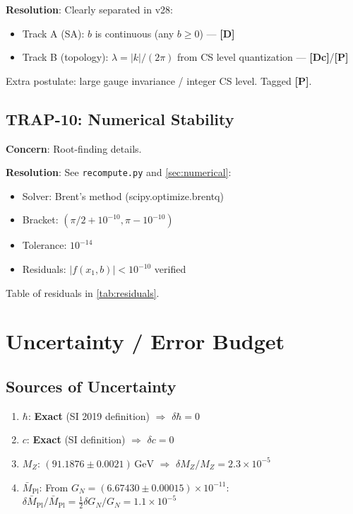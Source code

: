 \documentclass[11pt,a4paper]{article}
\newcommand{\Mpl}{\bar{M}_{\mathrm{Pl}}}
\newcommand{\MZ}{M_Z}
\newcommand{\GeV}{\,\mathrm{GeV}}
\newcommand{\tagD}{\textbf{[D]}}
\newcommand{\tagDc}{\textbf{[Dc]}}
\newcommand{\tagP}{\textbf{[P]}}
\theoremstyle{definition}
\theoremstyle{plain}
\theoremstyle{remark}
\begin{document}
\textbf{Resolution}: Clearly separated in v28:
\begin{itemize}
\item Track A (SA): $b$ is continuous (any $b \geq 0$) --- \tagD{}
\item Track B (topology): $\lambda = |k|/(2\pi)$ from CS level quantization --- \tagDc{}/\tagP{}
\end{itemize}

Extra postulate: large gauge invariance / integer CS level. Tagged \tagP{}.

\subsection{TRAP-10: Numerical Stability}
\label{sec:trap10}

\textbf{Concern}: Root-finding details.

\textbf{Resolution}: See \texttt{recompute.py} and \cref{sec:numerical}:
\begin{itemize}
\item Solver: Brent's method (scipy.optimize.brentq)
\item Bracket: $(\pi/2 + 10^{-10}, \pi - 10^{-10})$
\item Tolerance: $10^{-14}$
\item Residuals: $|f(x_1, b)| < 10^{-10}$ verified
\end{itemize}

Table of residuals in \cref{tab:residuals}.

\section{Uncertainty / Error Budget}
\label{sec:uncertainty}

\subsection{Sources of Uncertainty}

\begin{enumerate}
\item $\hbar$: \textbf{Exact} (SI 2019 definition) $\Rightarrow$ $\delta\hbar = 0$
\item $c$: \textbf{Exact} (SI definition) $\Rightarrow$ $\delta c = 0$
\item $\MZ$: $(91.1876 \pm 0.0021)\GeV$ $\Rightarrow$ $\delta\MZ/\MZ = 2.3 \times 10^{-5}$
\item $\Mpl$: From $G_N = (6.67430 \pm 0.00015) \times 10^{-11}$:
      $\delta\Mpl/\Mpl = \frac{1}{2}\delta G_N/G_N = 1.1 \times 10^{-5}$
\end{enumerate}
\end{document}
